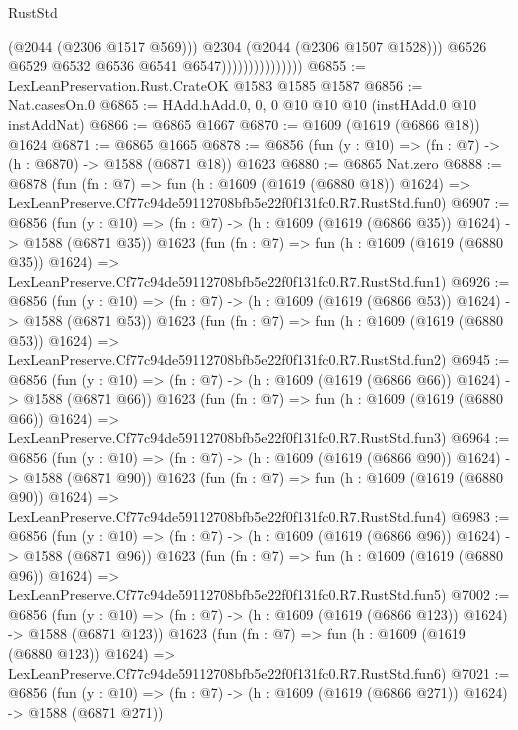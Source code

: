 \begin{lexlean}{RustStd}
\begin{coremodule}
                                      (@2044 (@2306 @1517 @569)))
                                    @2304
                                    (@2044 (@2306 @1507 @1528)))
                                  @6526
                                  @6529
                                  @6532
                                  @6536
                                  @6541
                                  @6547)))))))))))))))
@6855 := LexLeanPreservation.Rust.CrateOK @1583 @1585 @1587
@6856 := Nat.casesOn.{0}
@6865 := HAdd.hAdd.{0, 0, 0} @10 @10 @10 (instHAdd.{0} @10 instAddNat)
@6866 := @6865 @1667
@6870 := @1609 (@1619 (@6866 @18)) @1624
@6871 := @6865 @1665
@6878 := @6856 (fun (y : @10) => (fn : @7) -> (h : @6870) -> @1588 (@6871 @18)) @1623
@6880 := @6865 Nat.zero
@6888 := @6878
    (fun (fn : @7) =>
    fun (h : @1609 (@1619 (@6880 @18)) @1624) =>
    LexLeanPreserve.Cf77c94de59112708bfb5e22f0f131fc0.R7.RustStd.fun0)
@6907 := @6856
    (fun (y : @10) => (fn : @7) -> (h : @1609 (@1619 (@6866 @35)) @1624) -> @1588 (@6871 @35))
    @1623
    (fun (fn : @7) =>
    fun (h : @1609 (@1619 (@6880 @35)) @1624) =>
    LexLeanPreserve.Cf77c94de59112708bfb5e22f0f131fc0.R7.RustStd.fun1)
@6926 := @6856
    (fun (y : @10) => (fn : @7) -> (h : @1609 (@1619 (@6866 @53)) @1624) -> @1588 (@6871 @53))
    @1623
    (fun (fn : @7) =>
    fun (h : @1609 (@1619 (@6880 @53)) @1624) =>
    LexLeanPreserve.Cf77c94de59112708bfb5e22f0f131fc0.R7.RustStd.fun2)
@6945 := @6856
    (fun (y : @10) => (fn : @7) -> (h : @1609 (@1619 (@6866 @66)) @1624) -> @1588 (@6871 @66))
    @1623
    (fun (fn : @7) =>
    fun (h : @1609 (@1619 (@6880 @66)) @1624) =>
    LexLeanPreserve.Cf77c94de59112708bfb5e22f0f131fc0.R7.RustStd.fun3)
@6964 := @6856
    (fun (y : @10) => (fn : @7) -> (h : @1609 (@1619 (@6866 @90)) @1624) -> @1588 (@6871 @90))
    @1623
    (fun (fn : @7) =>
    fun (h : @1609 (@1619 (@6880 @90)) @1624) =>
    LexLeanPreserve.Cf77c94de59112708bfb5e22f0f131fc0.R7.RustStd.fun4)
@6983 := @6856
    (fun (y : @10) => (fn : @7) -> (h : @1609 (@1619 (@6866 @96)) @1624) -> @1588 (@6871 @96))
    @1623
    (fun (fn : @7) =>
    fun (h : @1609 (@1619 (@6880 @96)) @1624) =>
    LexLeanPreserve.Cf77c94de59112708bfb5e22f0f131fc0.R7.RustStd.fun5)
@7002 := @6856
    (fun (y : @10) => (fn : @7) -> (h : @1609 (@1619 (@6866 @123)) @1624) -> @1588 (@6871 @123))
    @1623
    (fun (fn : @7) =>
    fun (h : @1609 (@1619 (@6880 @123)) @1624) =>
    LexLeanPreserve.Cf77c94de59112708bfb5e22f0f131fc0.R7.RustStd.fun6)
@7021 := @6856
    (fun (y : @10) => (fn : @7) -> (h : @1609 (@1619 (@6866 @271)) @1624) -> @1588 (@6871 @271))

\end{coremodule}
\end{lexlean}
